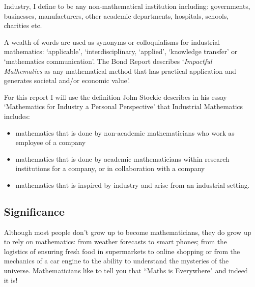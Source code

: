 \documentclass[11pt]{article} %
\begin{document}
	
 Industry,  I define to be any non-mathematical institution including: governments, businesses, manufacturers, other academic departments, hospitals, schools, charities etc. 


		A wealth of words are used as synonyms or colloquialisms for industrial mathematics: `applicable', `interdisciplinary, `applied', `knowledge transfer' or `mathematics communication'. The Bond Report \cite{Bond} describes `\textit{Impactful Mathematics} as any mathematical method that has practical application and generates societal and/or economic value'. 
		
		For this report I will use the definition John Stockie describes in his essay `Mathematics for Industry a Personal Perspective' \cite{Stockie2015} that Industrial Mathematics includes: 
		
	\begin{itemize}
	\item mathematics that is done by non-academic mathematicians who work as employee of a company
	\item mathematics that is done by academic mathematicians within research institutions for a company, or in collaboration with a company
	\item mathematics that is inspired by industry and arise from an industrial setting. 
	\end{itemize}
	
	
	\subsection{Significance \label{significance}}
	
Although most people don't grow up to become mathematicians, they do grow up to rely on mathematics: from weather forecasts to smart phones; from the logistics of ensuring fresh food in supermarkets to online shopping or from the mechanics of a car engine to  the ability to understand the mysteries of the universe. Mathematicians like to tell you that ``Maths is Everywhere" and indeed it is! 
\end{document}
